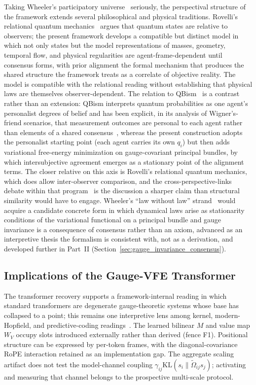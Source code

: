 \documentclass[11pt]{article}
\begin{document}
Taking Wheeler's participatory universe~\cite{Wheeler1990} seriously, the perspectival structure of the framework extends several philosophical and physical traditions. Rovelli's relational quantum mechanics~\cite{Rovelli1996} argues that quantum states are relative to observers; the present framework develops a compatible but distinct model in which not only states but the model representations of masses, geometry, temporal flow, and physical regularities are agent-frame-dependent until consensus forms, with prior alignment the formal mechanism that produces the shared structure the framework treats as a correlate of objective reality. The model is compatible with the relational reading without establishing that physical laws are themselves observer-dependent. The relation to QBism~\cite{Fuchs2014, Fuchs2017} is a contrast rather than an extension: QBism interprets quantum probabilities as one agent's personalist degrees of belief and has been explicit, in its analysis of Wigner's-friend scenarios, that measurement outcomes are personal to each agent rather than elements of a shared consensus~\cite{DeBrotaFuchsSchack2020}, whereas the present construction adopts the personalist starting point (each agent carries its own $q_i$) but then adds variational free-energy minimization on gauge-covariant principal bundles, by which intersubjective agreement emerges as a stationary point of the alignment terms. The closer relative on this axis is Rovelli's relational quantum mechanics, which does allow inter-observer comparison, and the cross-perspective-links debate within that program~\cite{Brukner2018, AdlamRovelli2022} is the discussion a sharper claim than structural similarity would have to engage. Wheeler's ``law without law'' strand~\cite{Wheeler1983} would acquire a candidate concrete form in which dynamical laws arise as stationarity conditions of the variational functional on a principal bundle and gauge invariance is a consequence of consensus rather than an axiom, advanced as an interpretive thesis the formalism is consistent with, not as a derivation, and developed further in Part~II (Section~\ref{sec:gauge_invariance_consensus}).

\subsection{Implications of the Gauge-VFE Transformer}

The transformer recovery supports a framework-internal reading in which standard transformers are degenerate gauge-theoretic systems whose base has collapsed to a point; this remains one interpretive lens among kernel, modern-Hopfield, and predictive-coding readings~\cite{tsai2019transformer, ramsauer2021hopfield, millidge2021predictive}. The learned bilinear $M$ and value map $W_V$ occupy slots introduced externally rather than derived (fence F1). Positional structure can be expressed by per-token frames, with the diagonal-covariance RoPE interaction retained as an implementation gap. The aggregate scaling artifact does not test the model-channel coupling $\gamma_{ij}\mathrm{KL}(s_i\|\tilde\Omega_{ij}s_j)$; activating and measuring that channel belongs to the prospective multi-scale protocol.
\end{document}
